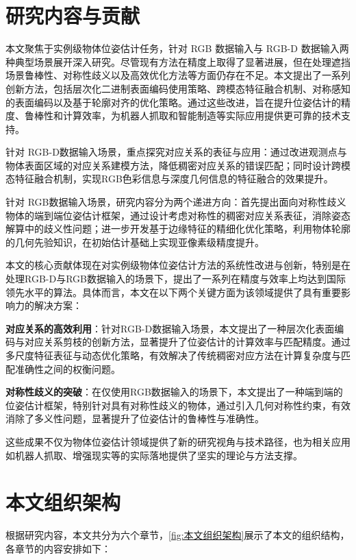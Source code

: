 \section{研究内容与贡献}
\par 本文聚焦于实例级物体位姿估计任务，针对 RGB 数据输入与 RGB-D 数据输入两种典型场景展开深入研究。尽管现有方法在精度上取得了显著进展，但在处理遮挡场景鲁棒性、对称性歧义以及高效优化方法等方面仍存在不足。本文提出了一系列创新方法，包括层次化二进制表面编码使用策略、跨模态特征融合机制、对称感知的表面编码以及基于轮廓对齐的优化策略。通过这些改进，旨在提升位姿估计的精度、鲁棒性和计算效率，为机器人抓取和智能制造等实际应用提供更可靠的技术支持。
\par 针对 RGB-D数据输入场景，重点探究对应关系的表征与应用：通过改进观测点与物体表面区域的对应关系建模方法，降低稠密对应关系的错误匹配；同时设计跨模态特征融合机制，实现RGB色彩信息与深度几何信息的特征融合的效果提升。
\par 针对 RGB数据输入场景，研究内容分为两个递进方向：首先提出面向对称性歧义物体的端到端位姿估计框架，通过设计考虑对称性的稠密对应关系表征，消除姿态解算中的歧义性问题；进一步开发基于边缘特征的精细化优化策略，利用物体轮廓的几何先验知识，在初始估计基础上实现亚像素级精度提升。
\par 本文的核心贡献体现在对实例级物体位姿估计方法的系统性改进与创新，特别是在处理RGB-D与RGB数据输入的场景下，提出了一系列在精度与效率上均达到国际领先水平的算法。具体而言，本文在以下两个关键方面为该领域提供了具有重要影响力的解决方案：
\par \textbf{对应关系的高效利用}：针对RGB-D数据输入场景，本文提出了一种层次化表面编码与对应关系剪枝的创新方法，显著提升了位姿估计的计算效率与匹配精度。通过多尺度特征表征与动态优化策略，有效解决了传统稠密对应方法在计算复杂度与匹配准确性之间的权衡问题。
\par \textbf{对称性歧义的突破}：在仅使用RGB数据输入的场景下，本文提出了一种端到端的位姿估计框架，特别针对具有对称性歧义的物体，通过引入几何对称性约束，有效消除了多义性问题，显著提升了位姿估计的鲁棒性与准确性。
\par 这些成果不仅为物体位姿估计领域提供了新的研究视角与技术路径，也为相关应用如机器人抓取、增强现实等的实际落地提供了坚实的理论与方法支撑。

\section{本文组织架构}

\par 根据研究内容，本文共分为六个章节，\autoref{fig:本文组织架构}展示了本文的组织结构，各章节的内容安排如下：

